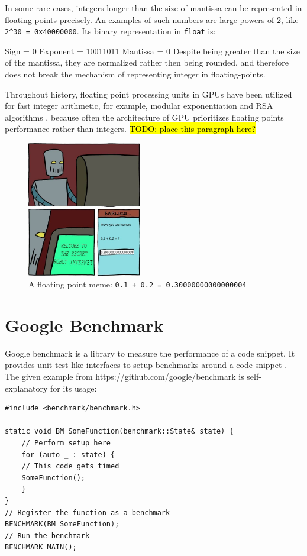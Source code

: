 \documentclass[logo,bsc,singlespacing,parskip]{infthesis}
\newcommand{\dtfloat}{\texttt{float}}
\newenvironment{VerbatimCompact}
  {\vspace*{-2.5mm}\VerbatimEnvironment
   \par\Verbatim}
  {\endVerbatim\vspace*{-2.4mm}}
\begin{document}
In some rare cases, integers longer than the size of mantissa can be represented
in floating points precisely. An examples of such numbers are large powers of 2,
like \texttt{2\^{}30 = 0x40000000}. Its binary representation in \dtfloat{}
is:
\begin{VerbatimCompact}
Sign     = 0
Exponent = 10011011
Mantissa = 0
\end{VerbatimCompact}
Despite being greater than the size of
the mantissa, they are normalized rather then being rounded, and therefore does
not break the mechanism of representing integer in floating-points.

Throughout history, floating point processing units in GPUs have been utilized
for fast integer arithmetic, for example, modular exponentiation
\cite{intfpu-modexp} and RSA algorithms \cite{intfpu-rsa}, because often the
architecture of GPU prioritizes floating points performance rather than
integers. 
\hl{TODO: place this paragraph here?}


\begin{figure}
\begin{center}
    \includegraphics[width=50mm,scale=0.1]{image/0.3004.jpg}
    \caption{A floating point meme: \texttt{0.1 + 0.2 = 0.30000000000000004}}
    \label{meme}
\end{center}
\end{figure}

\section{Google Benchmark}
Google benchmark is a library to measure the performance of a code snippet. It
provides unit-test like interfaces to setup benchmarks around a code snippet
\cite{googlebench}. The given example from https://github.com/google/benchmark
is self-explanatory for its usage: 

\begin{verbatim}
#include <benchmark/benchmark.h>

static void BM_SomeFunction(benchmark::State& state) {
    // Perform setup here
    for (auto _ : state) {
    // This code gets timed
    SomeFunction();
    }
}
// Register the function as a benchmark
BENCHMARK(BM_SomeFunction);
// Run the benchmark
BENCHMARK_MAIN();
\end{verbatim}
\end{document}
